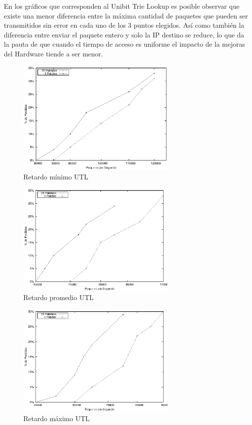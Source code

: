 En los gráficos que corresponden al Unibit Trie Lookup es posible observar que existe una menor diferencia entre la máxima cantidad de paquetes que pueden ser transmitidos sin error en cada uno de los 3 puntos elegidos. Así como también la diferencia entre enviar el paquete entero y solo la IP destino se reduce, lo que da la pauta de que cuando el tiempo de acceso es uniforme el impacto de la mejoras del Hardware tiende a ser menor.
\newpage
\begin{figure}[!h]
  \centering
	\includegraphics[width=0.7\textwidth]{5-resultados/graf/utlmin.eps}
  \caption{Retardo mínimo UTL}
  \label{fig}
\end{figure}
\begin{figure}[!h]
  \centering
	\includegraphics[width=0.7\textwidth]{5-resultados/graf/utlprom.eps}
  \caption{Retardo promedio UTL}
  \label{fig}
\end{figure}
\begin{figure}[!h]
  \centering
	\includegraphics[width=0.7\textwidth]{5-resultados/graf/utlmax.eps}
  \caption{Retardo máximo UTL}
  \label{fig}
\end{figure}

